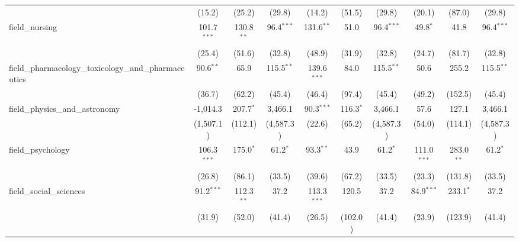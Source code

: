 \begin{tabular}{lccccccccc}
                                                               & (15.2)         & (25.2)          & (29.8)         & (14.2)        & (51.5)        & (29.8)         & (20.1)        & (87.0)          & (29.8)\\   
   field\_nursing                                              & 101.7$^{***}$  & 130.8$^{**}$    & 96.4$^{***}$   & 131.6$^{**}$  & 51.0          & 96.4$^{***}$   & 49.8$^{*}$    & 41.8            & 96.4$^{***}$\\   
                                                               & (25.4)         & (51.6)          & (32.8)         & (48.9)        & (31.9)        & (32.8)         & (24.7)        & (81.7)          & (32.8)\\   
   field\_pharmacology\_toxicology\_and\_pharmaceutics         & 90.6$^{**}$    & 65.9            & 115.5$^{**}$   & 139.6$^{***}$ & 84.0          & 115.5$^{**}$   & 50.6          & 255.2           & 115.5$^{**}$\\   
                                                               & (36.7)         & (62.2)          & (45.4)         & (46.4)        & (97.4)        & (45.4)         & (49.2)        & (152.5)         & (45.4)\\   
   field\_physics\_and\_astronomy                              & -1,014.3       & 207.7$^{*}$     & 3,466.1        & 90.3$^{***}$  & 116.3$^{*}$   & 3,466.1        & 57.6          & 127.1           & 3,466.1\\   
                                                               & (1,507.1)      & (112.1)         & (4,587.3)      & (22.6)        & (65.2)        & (4,587.3)      & (54.0)        & (114.1)         & (4,587.3)\\   
   field\_psychology                                           & 106.3$^{***}$  & 175.0$^{*}$     & 61.2$^{*}$     & 93.3$^{**}$   & 43.9          & 61.2$^{*}$     & 111.0$^{***}$ & 283.0$^{**}$    & 61.2$^{*}$\\   
                                                               & (26.8)         & (86.1)          & (33.5)         & (39.6)        & (67.2)        & (33.5)         & (23.3)        & (131.8)         & (33.5)\\   
   field\_social\_sciences                                     & 91.2$^{***}$   & 112.3$^{**}$    & 37.2           & 113.3$^{***}$ & 120.5         & 37.2           & 84.9$^{***}$  & 233.1$^{*}$     & 37.2\\   
                                                               & (31.9)         & (52.0)          & (41.4)         & (26.5)        & (102.0)       & (41.4)         & (23.9)        & (123.9)         & (41.4)\\   

\end{tabular}
